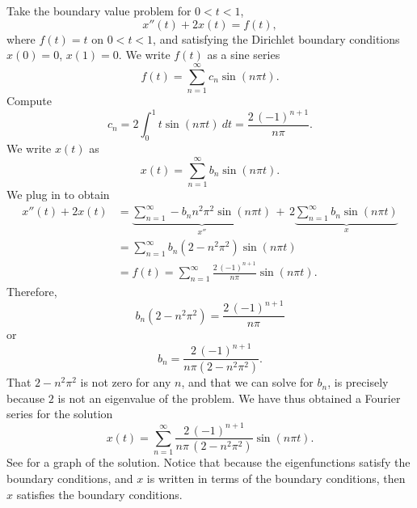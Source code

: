 \begin{example}
Take the boundary value problem for $0 < t < 1$,
\begin{equation*}
x''(t) + 2 x(t) = f(t) ,
\end{equation*}
where $f(t) = t$ on $0 < t < 1$, and 
satisfying the Dirichlet boundary conditions
$x(0) = 0$, $x(1)=0$.
We write $f(t)$ as a sine series
\begin{equation*}
f(t) = \sum_{n=1}^\infty c_n \sin (n \pi t) .
\end{equation*}
Compute
\begin{equation*}
c_n = 2 \int_0^1 t \sin (n \pi t) ~dt = \frac{2 \, {(-1)}^{n+1}}{n \pi} .
\end{equation*}
We write $x(t)$ as
\begin{equation*}
x(t) = \sum_{n=1}^\infty b_n \sin (n \pi t) .
\end{equation*}
We plug in to obtain 
\begin{equation*}
\begin{split}
x''(t) + 2 x(t) & =
\underbrace{
\sum_{n=1}^\infty - b_n n^2 \pi^2 \sin (n \pi t)
}_{x''}
\,
+
\,
2
\underbrace{
\sum_{n=1}^\infty b_n \sin (n \pi t)
}_{x}
\\
& =
\sum_{n=1}^\infty b_n (2 - n^2 \pi^2 ) \sin (n \pi t)
\\
& = f(t)
=
\sum_{n=1}^\infty  \frac{2\, {(-1)}^{n+1}}{n \pi} \sin (n \pi t) .
\end{split}
\end{equation*}
Therefore,
\begin{equation*}
b_n (2 - n^2 \pi^2)
=
\frac{2\,{(-1)}^{n+1}}{n \pi}
\end{equation*}
or
\begin{equation*}
b_n
=
\frac{2\,{(-1)}^{n+1}}{n \pi (2 - n^2 \pi^2)} .
\end{equation*}
That $2-n^2\pi^2$ is not zero for any $n$, and that we can
solve for $b_n$, is precisely because
$2$ is not an eigenvalue of the problem.
We have thus obtained a Fourier series for the solution
\begin{equation*}
x(t) = 
\sum_{n=1}^\infty
\frac{2\,{(-1)}^{n+1}}{n \pi \,(2 - n^2 \pi^2)}
\sin (n \pi t) .
\end{equation*}
See  for a graph of the solution.
Notice that because the eigenfunctions satisfy the boundary conditions, 
and $x$ is written in terms of the boundary conditions, then $x$
satisfies the boundary conditions.
\begin{myfig}
\capstart
{}
\caption{Plot of the solution of $x''+2x=t$, $x(0)=0$, $x(1)=0$.%
\label{bnd-dirich-graph:fig}}
\end{myfig}
\end{example}

